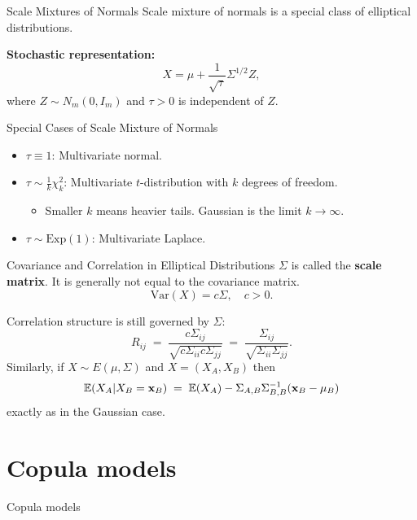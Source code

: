 \documentclass[11pt,handout,aspectratio=169]{beamer}
\begin{document}
\begin{frame}{Scale Mixtures of Normals}
Scale mixture of normals is a special class of elliptical distributions. 
\bigskip

  \textbf{Stochastic representation:}
  \begin{equation*}
    X = \mu + \frac{1}{\sqrt{\tau}} \Sigma^{1/2} Z,
  \end{equation*}
  where $Z \sim N_m(0, I_m)$ and $\tau > 0$ is independent of $Z$.
  \vspace{0.5cm}
  \begin{block}{Special Cases of Scale Mixture of Normals}
  	  \begin{itemize}
    \item $\tau \equiv 1$: Multivariate normal.
    \item $\tau \sim \frac{1}{k} \chi^2_k$: Multivariate $t$-distribution with $k$ degrees of freedom.
    \begin{itemize}
    \item Smaller $k$ means heavier tails. Gaussian is the limit $k\to \infty$.
    \end{itemize}
    \item $\tau \sim \text{Exp}(1)$: Multivariate Laplace.
  \end{itemize}
    \end{block}
\end{frame}

\begin{frame}{Covariance and Correlation in Elliptical Distributions}
$\Sigma$ is called the \textbf{scale matrix}. It is generally not equal to the covariance matrix.
\medskip
      \begin{equation*}
        \mathrm{Var}(X) = c \Sigma, \quad c > 0.
      \end{equation*}

Correlation structure is still governed by $\Sigma$:
$$
R_{ij}\;=\;\frac{c\Sigma_{ij}}{\sqrt{c\Sigma_{ii}c\Sigma_{jj}}}\;=\;\frac{\Sigma_{ij}}{\sqrt{\Sigma_{ii}\Sigma_{jj}}}.
$$
Similarly, if $X\sim E(\mu,\Sigma)$ and $X=(X_A,X_B)$ then 
$$
\mathbb E(X_A|X_B=\mathbf{x}_B)\;=\;\mathbb E(X_A)-\Sigma_{A,B}\Sigma_{B,B}^{-1}(\mathbf{x}_B-\mu_B)
$$
exactly as in the Gaussian case.
\end{frame}

\section{Copula models}
\begin{frame}{}
	\begin{center}
		{\Huge \alert{Copula models}}
	\end{center}
\end{frame}
\end{document}
